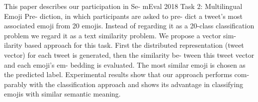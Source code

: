 This paper describes our participation in Se- mEval 2018 Task 2: Multilingual Emoji Pre- diction, in which participants are asked to pre- dict a tweet's most associated emoji from 20 emojis. Instead of regarding it as a 20-class classification problem we regard it as a text similarity problem. We propose a vector sim- ilarity based approach for this task. First the distributed representation (tweet vector) for each tweet is generated, then the similarity be- tween this tweet vector and each emoji's em- bedding is evaluated. The most similar emoji is chosen as the predicted label. Experimental results show that our approach performs com- parably with the classification approach and shows its advantage in classifying emojis with similar semantic meaning.
